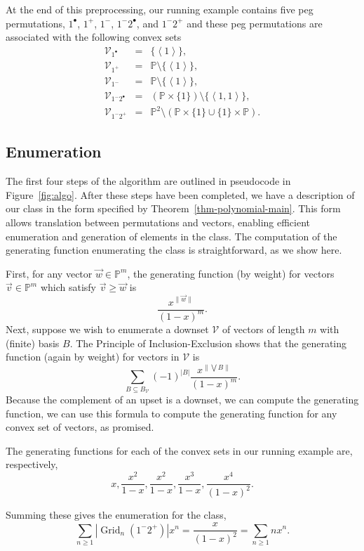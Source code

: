 \documentclass[10pt]{article}
\theoremstyle{plain}
\theoremstyle{definition}
\newcommand{\V}{\mathcal{V}}
\newcommand{\vect}[1]{\left\langle #1 \right\rangle}
\newcommand{\Grid}{\operatorname{Grid}}
\newcommand{\p}[1]{#1^+}
\newcommand{\m}[1]{#1^-}
\renewcommand{\d}[1]{#1^{\bullet}}
\begin{document}
At the end of this preprocessing, our running example contains five peg permutations, $\d 1$, $\p 1$, $\m 1$, $\m 1 \d 2$, and $\m 1 \p 2$ and these peg permutations are associated with the following convex sets
\begin{eqnarray*}
	\mathcal{V}_{\d 1}
	&=&
	\{\vect{1}\},\\
	\mathcal{V}_{\p 1}
	&=&
	\mathbb{P}\setminus\{\vect{1}\},\\
	\mathcal{V}_{\m 1}
	&=&
	\mathbb{P}\setminus\{\vect{1}\},\\
	\mathcal{V}_{\m 1 \d 2}
	&=&
	(\mathbb{P}\times\{1\})\setminus \{\vect{1,1}\},\\
	\mathcal{V}_{\m 1 \p 2}
	&=&
	\mathbb{P}^2\setminus \left(\mathbb{P}\times\{1\}\cup\{1\}\times\mathbb{P}\right).
\end{eqnarray*}

\subsection{Enumeration}

The first four steps of the algorithm are outlined in pseudocode in Figure~\ref{fig:algo}.  After these steps have been completed, we have a description of our class in the form specified by Theorem~\ref{thm-polynomial-main}. This form allows translation between permutations and vectors, enabling efficient enumeration and generation of elements in the class. The computation of the generating function enumerating the class is straightforward, as we show here. 

First, for any vector $\vec{w}\in\mathbb{P}^m$, the generating function (by weight) for vectors $\vec{v}\in\mathbb{P}^m$ which satisfy $\vec{v}\ge\vec{w}$ is
\[
	\frac{x^{\|\vec{w}\|}}{(1-x)^m}.
\]
Next, suppose we wish to enumerate a downset $\mathcal{V}$ of vectors of length $m$ with (finite) basis $B$. The Principle of Inclusion-Exclusion shows that the generating function (again by weight) for vectors in $\mathcal{V}$ is
\[
	\sum_{B \subseteq B_\V} (-1)^{|B|} \frac{x^{\| \bigvee B \|}}{(1 - x)^m}.
\]
Because the complement of an upset is a downset, we can compute the generating function, we can use this formula to compute the generating function for any convex set of vectors, as promised.

The generating functions for each of the convex sets in our running example are, respectively,
$$
x, \frac{x^2}{1-x}, \frac{x^2}{1-x}, \frac{x^3}{1-x}, \frac{x^4}{(1-x)^2}.
$$

Summing these gives the enumeration for the class,
\[
	\sum_{n \geq 1} | \Grid_n(\m 1 \p 2)| x^n
	=
	\frac{x}{(1-x)^2}
	=
	\sum_{n\ge 1} nx^n.
\]
\end{document}
